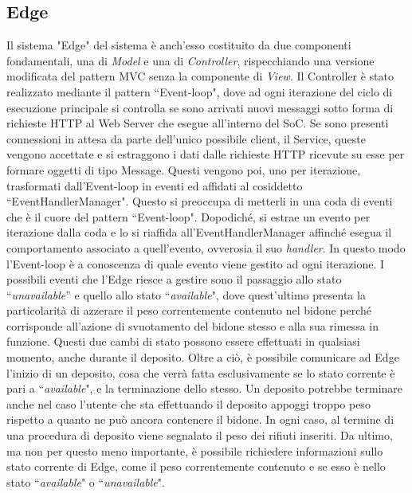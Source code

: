 \documentclass[a4paper, 12pt]{report}
\begin{document}
			\subsection{Edge}
			Il sistema "Edge" del sistema è anch'esso costituito da due componenti fondamentali, una di
			\textit{Model} e una di \textit{Controller}, rispecchiando una versione modificata del
			pattern MVC senza la componente di \textit{View}.\newline
			Il Controller è stato realizzato mediante il pattern ``Event-loop", dove ad ogni iterazione
			del ciclo di esecuzione principale si controlla se sono arrivati nuovi messaggi sotto forma
			di richieste HTTP al Web Server che esegue all'interno del SoC. Se sono presenti connessioni in attesa
			da parte dell'unico possibile client, il Service, queste vengono accettate e si
			estraggono i dati dalle richieste HTTP ricevute su esse per formare oggetti di tipo Message. Questi vengono poi, uno per
			iterazione, trasformati dall'Event-loop in eventi ed affidati al cosiddetto ``EventHandlerManager". 
			Questo si preoccupa di metterli in una coda di eventi che è il cuore
			del pattern ``Event-loop". Dopodiché, si estrae un evento per iterazione dalla coda e lo si
			riaffida all'EventHandlerManager affinché esegua il comportamento associato a
			quell'evento, ovverosia il suo \textit{handler}. In questo modo l'Event-loop è a conoscenza
			di quale evento viene gestito ad ogni iterazione.\newline
			I possibili eventi che
			l'Edge riesce a gestire sono il passaggio allo stato ``\textit{unavailable}'' e quello allo
			stato ``\textit{available}", dove quest'ultimo presenta la particolarità di azzerare il peso
			correntemente contenuto nel bidone perché corrisponde all'azione di svuotamento del bidone
			stesso e alla sua rimessa in funzione. Questi due cambi di stato possono essere effettuati
			in qualsiasi momento, anche durante il deposito.
			Oltre a ciò, è possibile comunicare ad Edge l'inizio
			di un deposito, cosa che verrà fatta esclusivamente se lo stato corrente è pari a
			``\textit{available}", e la terminazione dello stesso. Un deposito potrebbe terminare anche nel
			caso l'utente che sta effettuando il deposito appoggi troppo peso rispetto a quanto ne può
			ancora contenere il bidone. In ogni caso, al termine di una procedura di deposito viene
			segnalato il peso dei rifiuti inseriti. Da ultimo, ma non per questo meno importante, è
			possibile richiedere informazioni sullo stato corrente di Edge, come il peso correntemente
			contenuto e se esso è nello stato ``\textit{available}" o ``\textit{unavailable}".\newline
\end{document}
